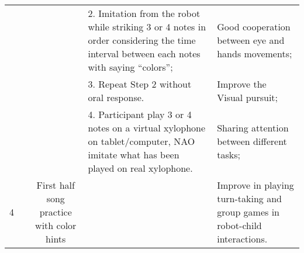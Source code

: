 \begin{sidewaystable}[tbp]
\begin{center}
{\begin{tabular}{cccll}
	{\color[HTML]{666666} }                    & {\color[HTML]{666666} }                                          & {\color[HTML]{666666} }                                                                                                                               & {\color[HTML]{666666} 2. Imitation from the robot   while striking 3 or 4 notes in order considering the time interval between   each notes with saying “colors”;}                   & {\color[HTML]{666666} Good cooperation between eye and hands   movements;}                                                                                             \\
	{\color[HTML]{666666} }                    & {\color[HTML]{666666} }                                          & {\color[HTML]{666666} }                                                                                                                               & {\color[HTML]{666666} 3. Repeat Step 2 without oral   response.}                                                                                                                     & {\color[HTML]{666666} Improve the Visual pursuit;}                                                                                                                     \\
	{\color[HTML]{666666} }                    & {\color[HTML]{666666} }                                          & {\color[HTML]{666666} }                                                                                                                               & {\color[HTML]{666666} 4. Participant play 3 or 4   notes on a virtual xylophone on tablet/computer, NAO imitate what has been   played on real xylophone.}                           & {\color[HTML]{666666} Sharing attention between different tasks;}                                                                                                      \\
	\multirow{-5}{*}{{\color[HTML]{666666} 4}} & {\color[HTML]{666666} }                                          & \multirow{-5}{*}{{\color[HTML]{666666} First half song practice with color hints}}                                                                    &                                                                                                                                                                                      & {\color[HTML]{666666} Improve in playing turn-taking and group games   in robot-child interactions.}                                                                   \\

\end{tabular}}
\end{center}
\end{sidewaystable}
